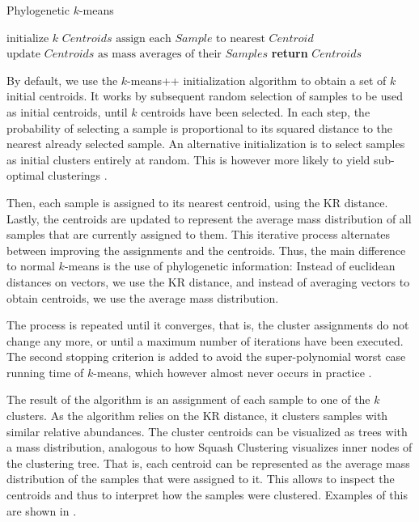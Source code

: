 \vspace*{1em} %
\begin{algorithm}
\caption{Phylogenetic $k$-means}\label{algo:kmeans}
\begin{algorithmic}[1]
    \State $ \text{initialize } \textit{k Centroids} $
        \State $ \text{assign each } \textit{Sample} \text{ to nearest } \textit{Centroid} $
        \State $ \text{update } \textit{Centroids} \text{ as mass averages of their } \textit{Samples} $
    \EndWhile
    \State \textbf{return}  $\textit{Centroids}$
\end{algorithmic}
\end{algorithm}

By default, we use the $k$-means++ initialization algorithm \cite{Arthur2007} to obtain a set of $k$ initial centroids.
It works by subsequent random selection of samples to be used as initial centroids,
until $k$ centroids have been selected.
In each step, the probability of selecting a sample is
proportional to its squared distance to the nearest already selected sample.
An alternative initialization is to select samples as initial clusters entirely at random.
This is however more likely to yield sub-optimal clusterings \cite{Kanungo2003}.

Then, each sample is assigned to its nearest centroid, using the KR distance. %
Lastly, the centroids are updated to represent
the average mass distribution of all samples that are currently assigned to them.
This iterative process alternates between improving the assignments and the centroids.
Thus, the main difference to normal $k$-means is the use of phylogenetic information:
Instead of euclidean distances on vectors, we use the KR distance,
and instead of averaging vectors to obtain centroids, we use the average mass distribution.

The process is repeated until it converges,
that is, the cluster assignments do not change any more,
or until a maximum number of iterations have been executed.
The second stopping criterion is added to avoid the super-polynomial worst case running time of $k$-means,
which however almost never occurs in practice \cite{Bottou1995,Arthur2006}.

The result of the algorithm is an assignment of each sample to one of the $k$ clusters.
As the algorithm relies on the KR distance, it clusters samples with similar relative abundances.
The cluster centroids can be visualized as trees with a mass distribution,
analogous to how Squash Clustering visualizes inner nodes of the clustering tree.
That is, each centroid can be represented as the average mass distribution of the samples that were assigned to it.
This allows to inspect the centroids and thus to interpret how the samples were clustered.
Examples of this are shown in .

